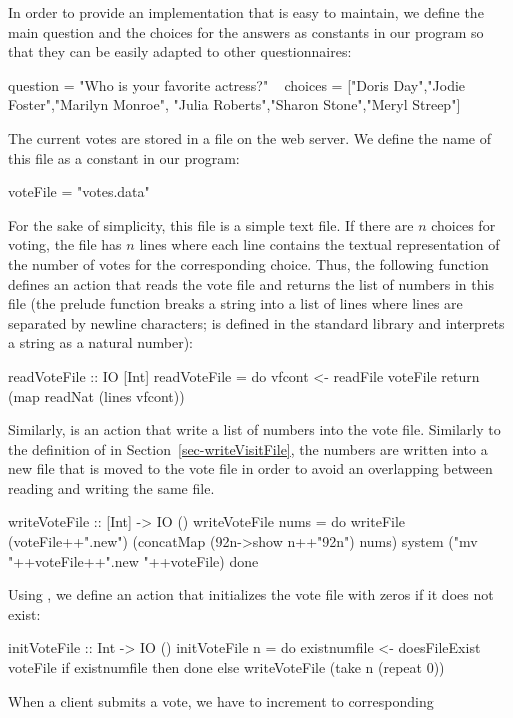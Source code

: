 In order to provide an implementation that is easy to maintain,
we define the main question and the choices for the answers
as constants in our program so that they can be easily adapted
to other questionnaires:
\begin{prog}
question = "Who is your favorite actress?"
~
choices = ["Doris Day","Jodie Foster","Marilyn Monroe",
           "Julia Roberts","Sharon Stone","Meryl Streep"]
\end{prog}
%
The current votes are stored in a file on the web server.
We define the name of this file as a constant in our program:
\begin{prog}
voteFile = "votes.data"
\end{prog}
For the sake of simplicity, this file is a simple text file.
If there are $n$ choices for voting, the file has $n$ lines
where each line contains the textual representation of the
number of votes for the corresponding choice.
Thus, the following function defines an action that reads
the vote file and returns the list of numbers in this file
(the prelude function  breaks
a string into a list of lines where lines are separated by newline
characters;  is defined in the
standard library  and interprets a string as a natural number):
\begin{prog}
readVoteFile :: IO [Int]
readVoteFile = do
  vfcont <- readFile voteFile
  return (map readNat (lines vfcont))
\end{prog}
Similarly,  is an action that write a list of
numbers into the vote file. Similarly to the definition of
 in Section~\ref{sec-writeVisitFile},
the numbers are written into a new file that is moved to the vote file
in order to avoid an overlapping between reading and writing the same file.
\begin{prog}
writeVoteFile :: [Int] -> IO ()
writeVoteFile nums = do
  writeFile (voteFile++".new") (concatMap (\char92n->show n++"\char92n") nums)
  system ("mv "++voteFile++".new "++voteFile)
  done
\end{prog}
Using , we define an action 
that initializes the vote file with  zeros if it does not exist:
\begin{prog}
initVoteFile :: Int -> IO ()
initVoteFile n = do
  existnumfile <- doesFileExist voteFile
  if existnumfile then done
                  else writeVoteFile (take n (repeat 0))
\end{prog}
When a client submits a vote, we have to increment to corresponding
